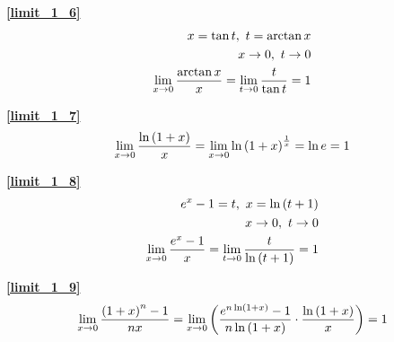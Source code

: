 \textbf{\large \ref{limit_1_6}}
\begin{displaymath}
    \centering
    \begin{split}
        x=\tan t,\ t=\arctan x\\ 
        x\rightarrow 0,\ t\rightarrow 0\\
        \lim\limits_{x\to 0}\frac{\arctan x}{x}=\lim\limits_{t\to 0}\frac{t}{\tan t}=1
    \end{split}
\end{displaymath}

\textbf{\large \ref{limit_1_7}}
\begin{displaymath}
    \centering
    \begin{split}
        \lim\limits_{x\to 0}\frac{\ln \left(1+x\right)}{x}=\lim\limits_{x\to 0}\ln \left(1+x\right)^\frac{1}{x}=\ln e=1
    \end{split}
\end{displaymath}

\textbf{\large \ref{limit_1_8}}
\begin{displaymath}
    \centering
    \begin{split}
        e^x-1=t,\ x=\ln\left(t+1\right)\\
        x\rightarrow 0,\ t\rightarrow 0\\
        \lim\limits_{x\to 0}\frac{e^x-1}{x}=\lim\limits_{t\to 0}\frac{t}{\ln\left(t+1\right)}=1
    \end{split}
\end{displaymath}

\textbf{\large \ref{limit_1_9}}
\begin{displaymath}
    \centering
    \begin{split}
        \lim\limits_{x\to 0}\frac{\left(1+x\right)^n-1}{nx}=\lim\limits_{x\to 0}\left(\frac{e^{n\ln \left(1+x\right)}-1}{n\ln\left(1+x\right)}\cdot\frac{\ln\left(1+x\right)}{x}\right)=1
    \end{split}
\end{displaymath}

